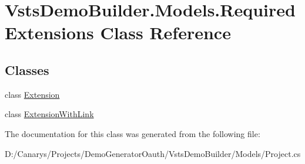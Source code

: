 \hypertarget{class_vsts_demo_builder_1_1_models_1_1_required_extensions}{}\section{Vsts\+Demo\+Builder.\+Models.\+Required\+Extensions Class Reference}
\label{class_vsts_demo_builder_1_1_models_1_1_required_extensions}
\subsection*{Classes}
\begin{DoxyCompactItemize}
\item 
class \mbox{\hyperlink{class_vsts_demo_builder_1_1_models_1_1_required_extensions_1_1_extension}{Extension}}
\item 
class \mbox{\hyperlink{class_vsts_demo_builder_1_1_models_1_1_required_extensions_1_1_extension_with_link}{Extension\+With\+Link}}
\end{DoxyCompactItemize}


The documentation for this class was generated from the following file\+:\begin{DoxyCompactItemize}
\item 
D\+:/\+Canarys/\+Projects/\+Demo\+Generator\+Oauth/\+Vsts\+Demo\+Builder/\+Models/Project.\+cs\end{DoxyCompactItemize}
